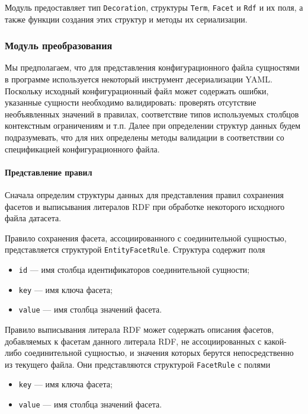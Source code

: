 Модуль предоставляет тип \texttt{Decoration}, структуры \texttt{Term}, \texttt{Facet} и
\texttt{Rdf} и их поля, а также функции создания этих структур и методы их сериализации.


\subsubsection{Модуль преобразования}

Мы предполагаем, что для представления конфигурационного файла сущностями в программе используется
некоторый инструмент десериализации YAML. Поскольку исходный конфигурационный файл может содержать
ошибки, указанные сущности необходимо валидировать: проверять отсутствие необъявленных значений в
правилах, соответствие типов используемых столбцов контекстным ограничениям и т.п. Далее при
определении структур данных будем подразумевать, что для них определены методы валидации
в соответствии со спецификацией конфигурационного файла.

\paragraph{Представление правил}

Сначала определим структуры данных для представления правил сохранения фасетов и выписывания литералов
RDF при обработке некоторого исходного файла датасета.

Правило сохранения фасета, ассоциированного с соединительной сущностью, представляется структурой
\texttt{EntityFacetRule}. Структура содержит поля
\begin{itemize}
    \item \texttt{id} --- имя столбца идентификаторов соединительной сущности;
    \item \texttt{key} --- имя ключа фасета;
    \item \texttt{value} --- имя столбца значений фасета.
\end{itemize}

Правило выписывания литерала RDF может содержать описания фасетов, добавляемых к фасетам данного
литерала RDF, не ассоциированных с какой-либо соединительной сущностью, и значения которых
берутся непосредственно из текущего файла. Они представляются структурой \texttt{FacetRule} с полями
\begin{itemize}
    \item \texttt{key} --- имя ключа фасета;
    \item \texttt{value} --- имя столбца значений фасета.
\end{itemize}

